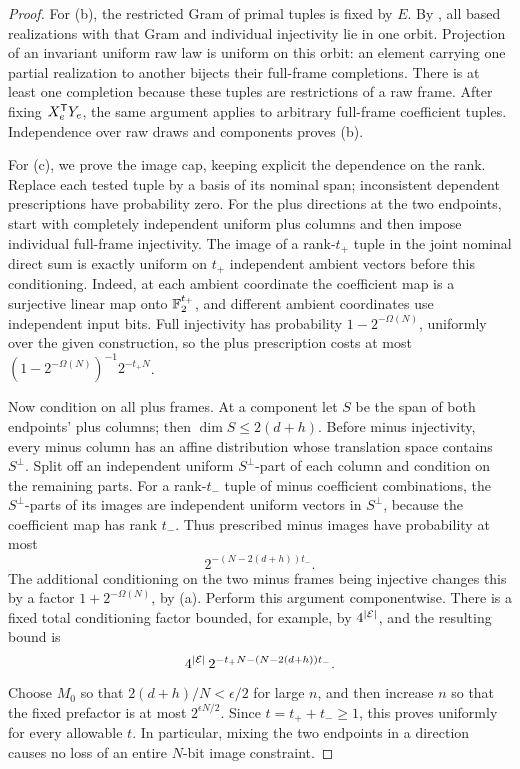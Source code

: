 \begin{proof}
For (b), the restricted Gram of primal tuples is fixed by \(E\).
By , all based realizations with that Gram and individual injectivity lie in one orbit.
Projection of an invariant uniform raw law is uniform on this orbit: an element carrying one partial realization to another bijects their full-frame completions.
There is at least one completion because these tuples are restrictions of a raw frame.
After fixing \(X_e^{\mathsf T} Y_e\), the same argument applies to arbitrary full-frame coefficient tuples.
Independence over raw draws and components proves (b).

For (c), we prove the image cap, keeping explicit the dependence on the rank.
Replace each tested tuple by a basis of its nominal span; inconsistent dependent prescriptions have probability zero.
For the plus directions at the two endpoints, start with completely independent uniform plus columns and then impose individual full-frame injectivity.
The image of a rank-\(t_+\) tuple in the joint nominal direct sum is exactly uniform on \(t_+\) independent ambient vectors before this conditioning.
Indeed, at each ambient coordinate the coefficient map is a surjective linear map onto \(\mathbb F_2^{t_+}\), and different ambient coordinates use independent input bits.
Full injectivity has probability \(1-2^{-\Omega(N)}\), uniformly over the given construction, so the plus prescription costs at most
\((1-2^{-\Omega(N)})^{-1}2^{-t_+N}\).

Now condition on all plus frames.
At a component let \(S\) be the span of both endpoints' plus columns; then \(\dim S\le2(d+h)\).
Before minus injectivity, every minus column has an affine distribution whose translation space contains \(S^\perp\).
Split off an independent uniform \(S^\perp\)-part of each column and condition on the remaining parts.
For a rank-\(t_-\) tuple of minus coefficient combinations, the \(S^\perp\)-parts of its images are independent uniform vectors in \(S^\perp\), because the coefficient map has rank \(t_-\).
Thus prescribed minus images have probability at most
\[
 2^{-(N-2(d+h))t_-}.
\]
The additional conditioning on the two minus frames being injective changes this by a factor \(1+2^{-\Omega(N)}\), by (a).
Perform this argument componentwise.
There is a fixed total conditioning factor bounded, for example, by \(4^{|\mathcal E|}\), and the resulting bound is
\[
 4^{|\mathcal E|}\,2^{-t_+N-(N-2(d+h))t_-}.
\]
Choose \(M_0\) so that \(2(d+h)/N<\epsilon/2\) for large \(n\), and then increase \(n\) so that the fixed prefactor is at most \(2^{\epsilon N/2}\).
Since \(t=t_++t_-\ge1\), this proves  uniformly for every allowable \(t\).
In particular, mixing the two endpoints in a direction causes no loss of an entire \(N\)-bit image constraint.
\end{proof}


